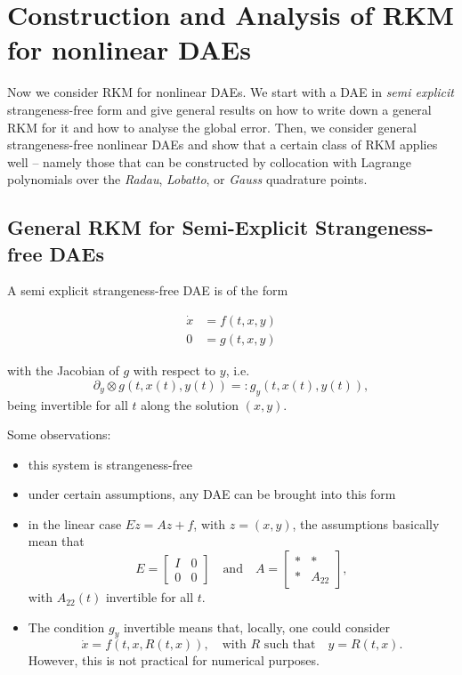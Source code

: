 \documentclass[]{book}
\providecommand{\tightlist}{%
  \setlength{\itemsep}{0pt}\setlength{\parskip}{0pt}}
\theoremstyle{definition}
\theoremstyle{definition}
\theoremstyle{definition}
\theoremstyle{remark}
\begin{document}
\chapter{Construction and Analysis of RKM for nonlinear
DAEs}\label{construction-and-analysis-of-rkm-for-nonlinear-daes}

Now we consider RKM for nonlinear DAEs. We start with a DAE in
\emph{semi explicit} strangeness-free form and give general results on
how to write down a general RKM for it and how to analyse the global
error. Then, we consider general strangeness-free nonlinear DAEs and
show that a certain class of RKM applies well -- namely those that can
be constructed by collocation with Lagrange polynomials over the
\emph{Radau}, \emph{Lobatto}, or \emph{Gauss} quadrature points.

\section{General RKM for Semi-Explicit Strangeness-free
DAEs}\label{general-rkm-for-semi-explicit-strangeness-free-daes}

A semi explicit strangeness-free DAE is of the form

\begin{align}
\dot x &= f(t, x, y) \label{eq:semexp-dae-diff} \\
0 &= g(t, x, y) \label{eq:semexp-dae-alg}
\end{align}

with the Jacobian of \(g\) with respect to \(y\), i.e. \[
\partial_y\otimes g(t, x(t), y(t)) =: g_y(t, x(t), y(t)),
\] being invertible for all \(t\) along the solution \((x,y)\).

Some observations:

\begin{itemize}
\tightlist
\item
  this system is strangeness-free
\item
  under certain assumptions, any DAE can be brought into this form
\item
  in the linear case \(E\dot z = Az +f\), with \(z=(x,y)\), the
  assumptions basically mean that \[
   E = \begin{bmatrix} I & 0 \\ 0 & 0 \end{bmatrix} \quad\text{and}\quad 
   A = \begin{bmatrix} * & * \\ * & A_{22} \end{bmatrix},
  \] with \(A_{22}(t)\) invertible for all \(t\).
\item
  The condition \(g_y\) invertible means that, locally, one could
  consider \[
   \dot x = f(t, x, R(t,x)), \quad\text{with $R$ such that}\quad y=R(t,x).
  \] However, this is not practical for numerical purposes.
\end{itemize}
\end{document}

